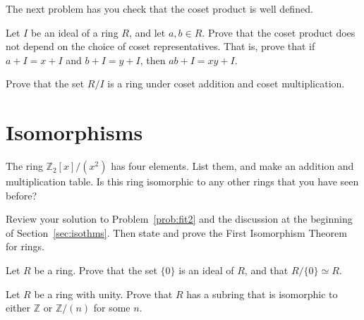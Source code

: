 The next problem has you check that the coset product is well defined.
\begin{annotation}
\end{annotation}

\begin{problem}
Let \(I\) be an ideal of a ring \(R\), and let \(a,b \in R\). Prove that the coset product does not depend on the choice of coset representatives. That is, prove that if \(a + I = x +I\) and \(b +I = y+I\), then \(ab + I = xy +I\).
\end{problem}

\begin{problem}
Prove that the set \(R/I\) is a ring under coset addition and coset multiplication.
\end{problem}

\section{Isomorphisms}

\begin{problem}
The ring \(\mathbb{Z}_2[x]/(x^2)\) has four elements. List them, and make an addition and multiplication table. Is this ring isomorphic to any other rings that you have seen before?
\end{problem}

\begin{problem}
Review your solution to Problem~\ref{prob:fit2} and the discussion at the beginning of Section~\ref{sec:isothms}. Then state and prove the First Isomorphism Theorem for rings.
\begin{annotation}
\end{annotation}
\end{problem}

\begin{problem}
Let \(R\) be a ring. Prove that the set \(\{0\}\) is an ideal of \(R\), and that \(R/\{0\} \simeq R\).
\end{problem}

\begin{problem}
 Let \(R\) be a ring with unity. Prove that \(R\) has a subring that is isomorphic to either \(\mathbb{Z}\) or \(\mathbb{Z}/ (n)\) for some \(n\).
\end{problem}

